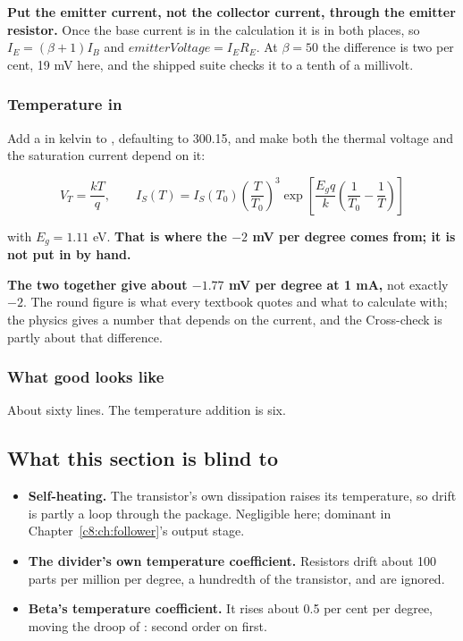 \textbf{Put the emitter current, not the collector current, through the emitter resistor.} Once the base current is in the calculation it is in both places, so $I_E = (\beta + 1)I_B$ and $emitterVoltage = I_E R_E$. At $\beta = 50$ the difference is two per cent, 19 mV here, and the shipped suite checks it to a tenth of a millivolt.

\subsubsection{Temperature in }
Add a  in kelvin to , defaulting to 300.15, and make both the thermal voltage and the saturation current depend on it:

\[
  V_T = \frac{kT}{q}, \qquad
  I_S(T) = I_S(T_0)\left(\frac{T}{T_0}\right)^3 \exp\left[\frac{E_g q}{k}\left(\frac{1}{T_0}-\frac{1}{T}\right)\right]
\]

with $E_g = 1.11$ eV. \textbf{That is where the $-2$ mV per degree comes from; it is not put in by hand.}

\textbf{The two together give about $-1.77$ mV per degree at 1 mA,} not exactly $-2$. The round figure is what every textbook quotes and what to calculate with; the physics gives a number that depends on the current, and the Cross-check is partly about that difference.

\subsubsection{What good looks like}
About sixty lines. The temperature addition is six.

\subsection{What this section is blind to}
\label{c6:sec:b6}
\begin{itemize}
  \item \textbf{Self-heating.} The transistor's own dissipation raises its temperature, so drift is partly a loop through the package. Negligible here; dominant in Chapter~\ref{c8:ch:follower}'s output stage.
  \item \textbf{The divider's own temperature coefficient.} Resistors drift about 100 parts per million per degree, a hundredth of the transistor, and are ignored.
  \item \textbf{Beta's temperature coefficient.} It rises about 0.5 per cent per degree, moving the droop of : second order on first.
\end{itemize}
